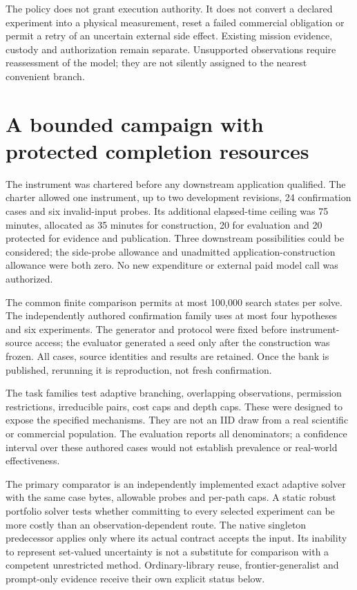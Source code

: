 \documentclass[10pt,letterpaper]{article}
\begin{document}
The policy does not grant execution authority. It does not convert a
declared experiment into a physical measurement, reset a failed
commercial obligation or permit a retry of an uncertain external side
effect. Existing mission evidence, custody and authorization remain
separate. Unsupported observations require reassessment of the model;
they are not silently assigned to the nearest convenient branch.

\hypertarget{a-bounded-campaign-with-protected-completion-resources}{%
\section{A bounded campaign with protected completion
resources}\label{a-bounded-campaign-with-protected-completion-resources}}

The instrument was chartered before any downstream application
qualified. The charter allowed one instrument, up to two development
revisions, 24 confirmation cases and six invalid-input probes. Its
additional elapsed-time ceiling was 75 minutes, allocated as 35 minutes
for construction, 20 for evaluation and 20 protected for evidence and
publication. Three downstream possibilities could be considered; the
side-probe allowance and unadmitted application-construction allowance
were both zero. No new expenditure or external paid model call was
authorized.

The common finite comparison permits at most 100,000 search states per
solve. The independently authored confirmation family uses at most four
hypotheses and six experiments. The generator and protocol were fixed
before instrument-source access; the evaluator generated a seed only
after the construction was frozen. All cases, source identities and
results are retained. Once the bank is published, rerunning it is
reproduction, not fresh confirmation.

The task families test adaptive branching, overlapping observations,
permission restrictions, irreducible pairs, cost caps and depth caps.
These were designed to expose the specified mechanisms. They are not an
IID draw from a real scientific or commercial population. The evaluation
reports all denominators; a confidence interval over these authored
cases would not establish prevalence or real-world effectiveness.

The primary comparator is an independently implemented exact adaptive
solver with the same case bytes, allowable probes and per-path caps. A
static robust portfolio solver tests whether committing to every
selected experiment can be more costly than an observation-dependent
route. The native singleton predecessor applies only where its actual
contract accepts the input. Its inability to represent set-valued
uncertainty is not a substitute for comparison with a competent
unrestricted method. Ordinary-library reuse, frontier-generalist and
prompt-only evidence receive their own explicit status below.
\end{document}
